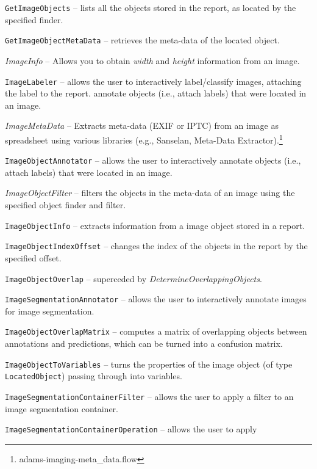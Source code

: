 \documentclass[a4paper]{book}
\begin{document}
\begin{tight_itemize}
  \item \texttt{GetImageObjects} -- lists all the objects stored in the
  report, as located by the specified finder.
  \item \texttt{GetImageObjectMetaData} -- retrieves the meta-data of
  the located object.
  \item \textit{ImageInfo} -- Allows you to obtain \textit{width} and
  \textit{height} information from an image.
  \item \texttt{ImageLabeler} -- allows the user to interactively label/classify
  images, attaching the label to the report.
   annotate objects (i.e., attach labels) that were located in an image.
  \item \textit{ImageMetaData} -- Extracts meta-data (EXIF or IPTC) from an
  image as spreadsheet using various libraries (e.g., Sanselan\cite{sanselan},
  Meta-Data Extractor\cite{metadataextractor}).\footnote{adams-imaging-meta\_data.flow}
  \item \texttt{ImageObjectAnnotator} -- allows the user to interactively
   annotate objects (i.e., attach labels) that were located in an image.
  \item \textit{ImageObjectFilter} -- filters the objects in the meta-data of an image
  using the specified object finder and filter.
  \item \texttt{ImageObjectInfo} -- extracts information from a image object
  stored in a report.
  \item \texttt{ImageObjectIndexOffset} -- changes the index of the objects in the
  report by the specified offset.
  \item \texttt{ImageObjectOverlap} -- superceded by \textit{DetermineOverlappingObjects}.
  \item \texttt{ImageSegmentationAnnotator} -- allows the user to interactively
  annotate images for image segmentation.
  \item \texttt{ImageObjectOverlapMatrix} -- computes a matrix of overlapping objects between
  annotations and predictions, which can be turned into a confusion matrix.
  \item \texttt{ImageObjectToVariables} -- turns the properties of the image object
  (of type \texttt{LocatedObject}) passing through into variables.
  \item \texttt{ImageSegmentationContainerFilter} -- allows the user to apply a
  filter to an image segmentation container.
  \item \texttt{ImageSegmentationContainerOperation} -- allows the user to apply

\end{tight_itemize}
\end{document}
